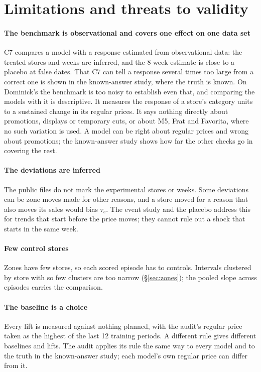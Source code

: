 \section{Limitations and threats to validity}
\label{sec:limits}

\paragraph{The benchmark is observational and covers one effect on one data set}
C7 compares a model with a response estimated from observational data: the
treated stores and weeks are inferred, and the 8-week estimate is close to a
placebo at false dates. That C7 can tell a response several times too large from
a correct one is shown in the known-answer study, where the truth is known. On
Dominick's the benchmark is too noisy to establish even that, and comparing the
models with it is descriptive. It measures the response
of a store's category units to a sustained change in its regular prices. It says nothing directly about promotions,
displays or temporary cuts, or about M5, Frat and Favorita, where no such variation is used. A model can be right about regular prices and wrong about
promotions; the known-answer study shows how far the other checks go in
covering the rest.

\paragraph{The deviations are inferred}
The public files do not mark the experimental stores or weeks. Some deviations
can be zone moves made for other reasons, and a store moved for a reason that
also moves its sales would bias $\tau_e$. The event study and the placebo
address this for trends that start before the price moves; they cannot rule out
a shock that starts in the same week.

\paragraph{Few control stores}
Zones have few stores, so each scored episode has \zControlsLo{} to
\zControlsHi{} controls. Intervals clustered
by store with so few clusters are too narrow (\S\ref{sec:zones}); the pooled
slope across episodes carries the comparison.

\paragraph{The baseline is a choice}
Every lift is measured against nothing planned, with the audit's regular price
taken as the highest of the last 12 training periods. A different rule gives
different baselines and lifts. The audit applies its rule the same way to every
model and to the truth in the known-answer study; each model's own regular
price can differ from it.


